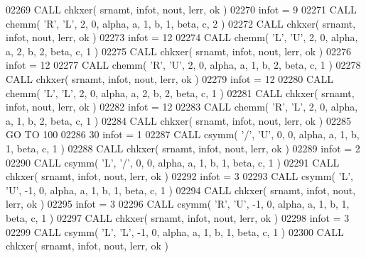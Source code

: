 \begin{DoxyCode}
02269       \textcolor{keyword}{CALL }chkxer( srnamt, infot, nout, lerr, ok )
02270       infot = 9
02271       \textcolor{keyword}{CALL }chemm( \textcolor{stringliteral}{'R'}, \textcolor{stringliteral}{'L'}, 2, 0, alpha, a, 1, b, 1, beta, c, 2 )
02272       \textcolor{keyword}{CALL }chkxer( srnamt, infot, nout, lerr, ok )
02273       infot = 12
02274       \textcolor{keyword}{CALL }chemm( \textcolor{stringliteral}{'L'}, \textcolor{stringliteral}{'U'}, 2, 0, alpha, a, 2, b, 2, beta, c, 1 )
02275       \textcolor{keyword}{CALL }chkxer( srnamt, infot, nout, lerr, ok )
02276       infot = 12
02277       \textcolor{keyword}{CALL }chemm( \textcolor{stringliteral}{'R'}, \textcolor{stringliteral}{'U'}, 2, 0, alpha, a, 1, b, 2, beta, c, 1 )
02278       \textcolor{keyword}{CALL }chkxer( srnamt, infot, nout, lerr, ok )
02279       infot = 12
02280       \textcolor{keyword}{CALL }chemm( \textcolor{stringliteral}{'L'}, \textcolor{stringliteral}{'L'}, 2, 0, alpha, a, 2, b, 2, beta, c, 1 )
02281       \textcolor{keyword}{CALL }chkxer( srnamt, infot, nout, lerr, ok )
02282       infot = 12
02283       \textcolor{keyword}{CALL }chemm( \textcolor{stringliteral}{'R'}, \textcolor{stringliteral}{'L'}, 2, 0, alpha, a, 1, b, 2, beta, c, 1 )
02284       \textcolor{keyword}{CALL }chkxer( srnamt, infot, nout, lerr, ok )
02285       \textcolor{keywordflow}{GO TO} 100
02286    30 infot = 1
02287       \textcolor{keyword}{CALL }csymm( \textcolor{stringliteral}{'/'}, \textcolor{stringliteral}{'U'}, 0, 0, alpha, a, 1, b, 1, beta, c, 1 )
02288       \textcolor{keyword}{CALL }chkxer( srnamt, infot, nout, lerr, ok )
02289       infot = 2
02290       \textcolor{keyword}{CALL }csymm( \textcolor{stringliteral}{'L'}, \textcolor{stringliteral}{'/'}, 0, 0, alpha, a, 1, b, 1, beta, c, 1 )
02291       \textcolor{keyword}{CALL }chkxer( srnamt, infot, nout, lerr, ok )
02292       infot = 3
02293       \textcolor{keyword}{CALL }csymm( \textcolor{stringliteral}{'L'}, \textcolor{stringliteral}{'U'}, -1, 0, alpha, a, 1, b, 1, beta, c, 1 )
02294       \textcolor{keyword}{CALL }chkxer( srnamt, infot, nout, lerr, ok )
02295       infot = 3
02296       \textcolor{keyword}{CALL }csymm( \textcolor{stringliteral}{'R'}, \textcolor{stringliteral}{'U'}, -1, 0, alpha, a, 1, b, 1, beta, c, 1 )
02297       \textcolor{keyword}{CALL }chkxer( srnamt, infot, nout, lerr, ok )
02298       infot = 3
02299       \textcolor{keyword}{CALL }csymm( \textcolor{stringliteral}{'L'}, \textcolor{stringliteral}{'L'}, -1, 0, alpha, a, 1, b, 1, beta, c, 1 )
02300       \textcolor{keyword}{CALL }chkxer( srnamt, infot, nout, lerr, ok )

\end{DoxyCode}
